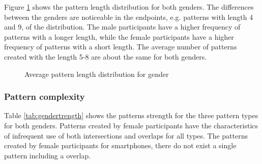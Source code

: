     Figure \ref{fig:avgpatterndistgender} shows the pattern length distribution for both genders. The differences between the genders are noticeable in the endpoints, e.g. patterns with length 4 and 9, of the distribution. The male participants have a higher frequency of patterns with a longer length, while the female participants have a higher frequency of patterns with a short length. The average number of patterns created with the length 5-8 are about the same for both genders. 

    \begin{figure}[H]
    	\centering
    	\caption{Average pattern length distribution for gender}
    	\label{fig:avgpatterndistgender}
    \end{figure}

    \subsubsection{Pattern complexity}

    Table \ref{tab:gendertrength} shows the patterns strength for the three pattern types for both genders. Patterns created by female participants have the characteristics of infrequent use of both intersections and overlaps for all types. The patterns created by female participants for smartphones, there do not exist a single pattern including a overlap.

